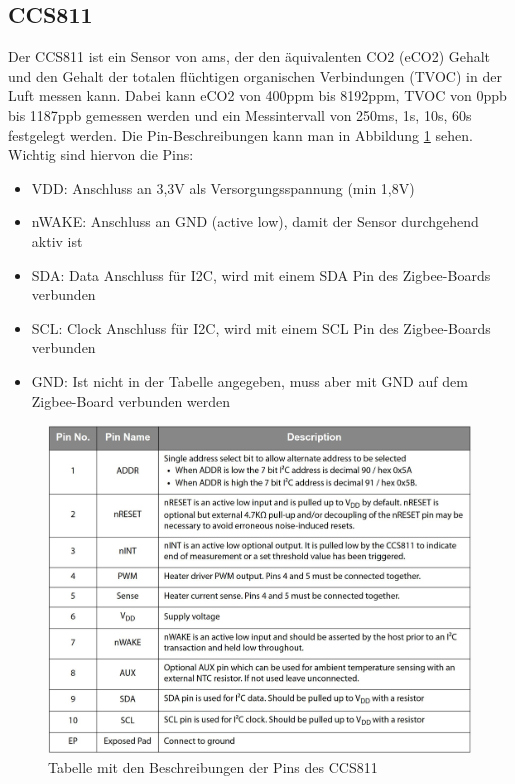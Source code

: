 \documentclass[]{article}
\begin{document}
		\subsection{CCS811}
			Der CCS811 \cite{ccs_datasheet}ist ein Sensor von ams, der den äquivalenten CO2 (eCO2) Gehalt und den Gehalt der totalen flüchtigen organischen Verbindungen (TVOC) in der Luft messen kann. Dabei kann eCO2 von 400ppm bis 8192ppm, TVOC von 0ppb bis 1187ppb gemessen werden und ein Messintervall von 250ms, 1s, 10s, 60s festgelegt werden. Die Pin-Beschreibungen kann man in Abbildung \ref{img:ccs_pintable} sehen. Wichtig sind hiervon die Pins:
			\begin{itemize}
				\item VDD: Anschluss an 3,3V als Versorgungsspannung (min 1,8V)
				\item nWAKE: Anschluss an GND (active low), damit der Sensor durchgehend aktiv ist
				\item SDA: Data Anschluss für I2C, wird mit einem SDA Pin des Zigbee-Boards verbunden
				\item SCL: Clock Anschluss für I2C, wird mit einem SCL Pin des Zigbee-Boards verbunden
				\item GND: Ist nicht in der Tabelle angegeben, muss aber mit GND auf dem Zigbee-Board verbunden werden
			\end{itemize}
			\begin{figure}[!h]
				\centering
				\includegraphics[scale=0.50]{images/ccs_pintable}
				\caption{Tabelle mit den Beschreibungen der Pins des CCS811}
				\label{img:ccs_pintable}
			\end{figure}
\end{document}
